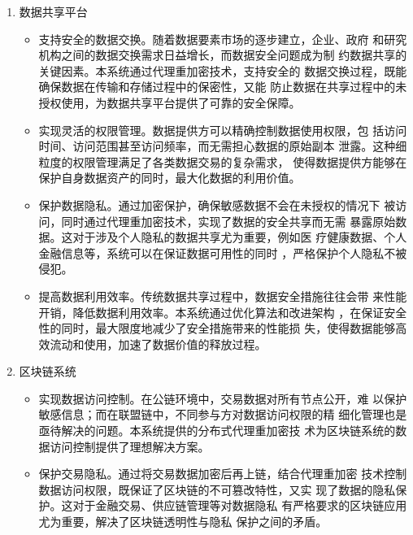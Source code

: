 \begin{enumerate}
	\item 数据共享平台
	      \begin{itemize}
		      \item 支持安全的数据交换。随着数据要素市场的逐步建立，企业、政府
		            和研究机构之间的数据交换需求日益增长，而数据安全问题成为制
		            约数据共享的关键因素。本系统通过代理重加密技术，支持安全的
		            数据交换过程，既能确保数据在传输和存储过程中的保密性，又能
		            防止数据在共享过程中的未授权使用，为数据共享平台提供了可靠的安全保障。

		      \item 实现灵活的权限管理。数据提供方可以精确控制数据使用权限，包
		            括访问时间、访问范围甚至访问频率，而无需担心数据的原始副本
		            泄露。这种细粒度的权限管理满足了各类数据交易的复杂需求，
		            使得数据提供方能够在保护自身数据资产的同时，最大化数据的利用价值。

		      \item 保护数据隐私。通过加密保护，确保敏感数据不会在未授权的情况下
		            被访问，同时通过代理重加密技术，实现了数据的安全共享而无需
		            暴露原始数据。这对于涉及个人隐私的数据共享尤为重要，例如医
		            疗健康数据、个人金融信息等，系统可以在保证数据可用性的同时
		            ，严格保护个人隐私不被侵犯。

		      \item 提高数据利用效率。传统数据共享过程中，数据安全措施往往会带
		            来性能开销，降低数据利用效率。本系统通过优化算法和改进架构
		            ，在保证安全性的同时，最大限度地减少了安全措施带来的性能损
		            失，使得数据能够高效流动和使用，加速了数据价值的释放过程。
	      \end{itemize}

	\item 区块链系统
	      \begin{itemize}
		      \item 实现数据访问控制。在公链环境中，交易数据对所有节点公开，难
		            以保护敏感信息；而在联盟链中，不同参与方对数据访问权限的精
		            细化管理也是亟待解决的问题。本系统提供的分布式代理重加密技
		            术为区块链系统的数据访问控制提供了理想解决方案。

		      \item 保护交易隐私。通过将交易数据加密后再上链，结合代理重加密
		            技术控制数据访问权限，既保证了区块链的不可篡改特性，又实
		            现了数据的隐私保护。这对于金融交易、供应链管理等对数据隐私
		            有严格要求的区块链应用尤为重要，解决了区块链透明性与隐私
		            保护之间的矛盾。


\end{itemize}
\end{enumerate}
